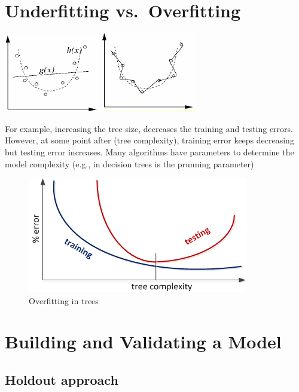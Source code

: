 \documentclass[]{book}
\begin{document}
\section{Underfitting
vs.~Overfitting}\label{underfitting-vs.overfitting}

\includegraphics{figures/underfitting.png}
\includegraphics{figures/overfitting.png}

For example, increasing the tree size, decreases the training and
testing errors. However, at some point after (tree complexity), training
error keeps decreasing but testing error increases. Many algorithms have
parameters to determine the model complexity (e.g., in decision trees is
the prunning parameter)

\begin{figure}[htbp]
\centering
\includegraphics{figures/overfittingTrees.png}
\caption{Overfitting in trees}
\end{figure}

\section{Building and Validating a
Model}\label{building-and-validating-a-model}

\subsection{Holdout approach}\label{holdout-approach}
\end{document}
